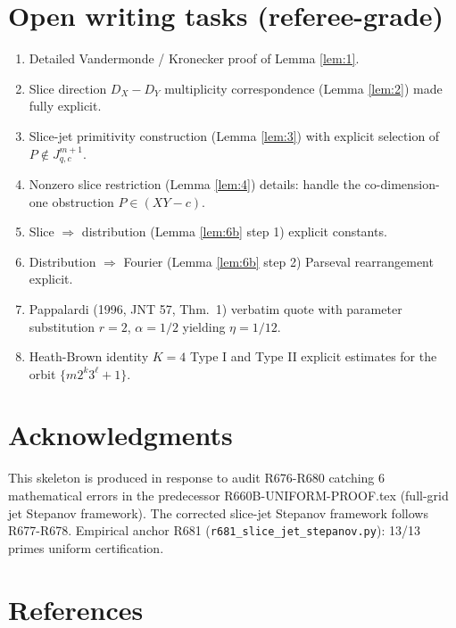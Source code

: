 \documentclass[12pt]{amsart}
\theoremstyle{definition}
\theoremstyle{remark}
\begin{document}
\section{Open writing tasks (referee-grade)}

\begin{enumerate}
\item Detailed Vandermonde / Kronecker proof of Lemma \ref{lem:1}.
\item Slice direction $D_X - D_Y$ multiplicity correspondence (Lemma \ref{lem:2}) made fully explicit.
\item Slice-jet primitivity construction (Lemma \ref{lem:3}) with explicit selection of $P \notin J_{q,c}^{m+1}$.
\item Nonzero slice restriction (Lemma \ref{lem:4}) details: handle the
co-dimension-one obstruction $P \in (X Y - c)$.
\item Slice $\Rightarrow$ distribution (Lemma \ref{lem:6b} step 1) explicit constants.
\item Distribution $\Rightarrow$ Fourier (Lemma \ref{lem:6b} step 2) Parseval rearrangement explicit.
\item Pappalardi (1996, JNT 57, Thm.\ 1) verbatim quote with parameter substitution $r=2$, $\alpha=1/2$ yielding $\eta = 1/12$.
\item Heath-Brown identity $K = 4$ Type I and Type II explicit estimates for the orbit $\{m 2^k 3^\ell + 1\}$.
\end{enumerate}

\section*{Acknowledgments}

This skeleton is produced in response to audit R676-R680 catching 6 mathematical errors in the predecessor R660B-UNIFORM-PROOF.tex (full-grid jet Stepanov framework). The corrected slice-jet Stepanov framework follows R677-R678. Empirical anchor R681 (\texttt{r681\_slice\_jet\_stepanov.py}): 13/13 primes uniform certification.

\section*{References}
\end{document}
